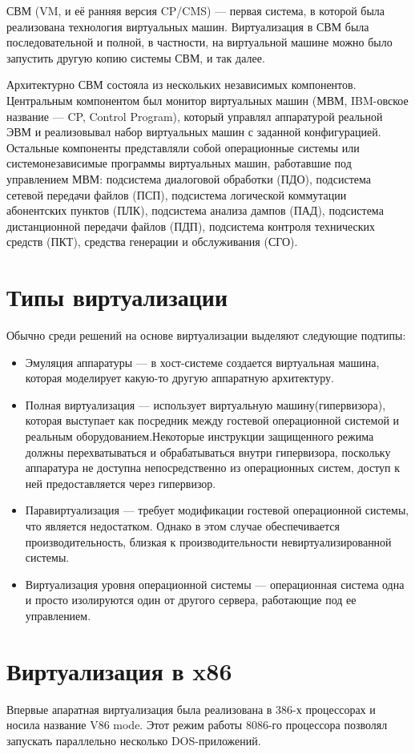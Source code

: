 \documentclass[10pt, a5paper]{article}
\begin{document}
СВМ (VM, и её ранняя версия CP/CMS) --- первая система, в которой была реализована технология виртуальных машин. Виртуализация в СВМ была последовательной и полной, в частности, на виртуальной машине можно было запустить другую копию системы СВМ, и так далее.

Архитектурно СВМ состояла из нескольких независимых компонентов. Центральным компонентом был монитор виртуальных машин (МВМ, IBM-овское название --- CP, Control Program), который управлял аппаратурой реальной ЭВМ и реализовывал набор виртуальных машин с заданной конфигурацией. Остальные компоненты представляли собой операционные системы или системонезависимые программы виртуальных машин, работавшие под управлением МВМ: подсистема диалоговой обработки (ПДО), подсистема сетевой передачи файлов (ПСП), подсистема логической коммутации абонентских пунктов (ПЛК), подсистема анализа дампов (ПАД), подсистема дистанционной передачи файлов (ПДП), подсистема контроля технических средств (ПКТ), средства генерации и обслуживания (СГО).

\section*{Типы виртуализации}
Обычно среди решений на основе виртуализации выделяют следующие подтипы:
\begin{itemize}
	\item Эмуляция аппаратуры --- в хост-системе создается виртуальная машина, которая моделирует какую-то другую аппаратную архитектуру.
	\item Полная виртуализация --- использует виртуальную машину(гипервизора), которая выступает как посредник между гостевой операционной системой и реальным оборудованием.Некоторые инструкции защищенного режима должны перехватываться и обрабатываться внутри гипервизора, поскольку аппаратура не доступна непосредственно из операционных систем, доступ к ней предоставляется через гипервизор.
	\item Паравиртуализация --- требует модификации гостевой операционной системы, что является недостатком. Однако в этом случае обеспечивается производительность, близкая к производительности невиртуализированной системы. 
	\item Виртуализация уровня операционной системы --- операционная система одна и просто изолируются один от другого сервера, работающие под ее управлением.
\end{itemize}

\section*{Виртуализация в x86}
Впервые апаратная виртуализация была реализована в 386-х процессорах и носила название V86 mode. Этот режим работы 8086-го процессора позволял запускать параллельно несколько DOS-приложений.
\end{document}
